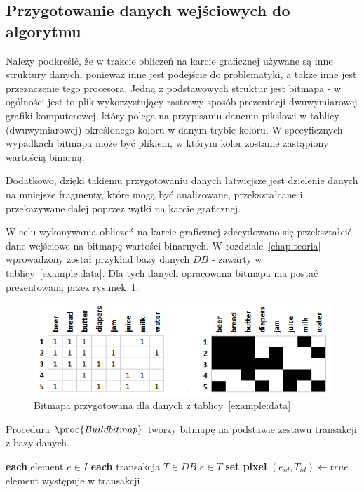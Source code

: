 \subsection{Przygotowanie danych wejściowych do algorytmu}

Należy podkreślć, że w trakcie obliczeń na karcie graficznej używane są inne struktury danych, ponieważ inne jest podejście do problematyki, a także inne jest przeznczenie tego procesora. Jedną z podstawowych struktur jest bitmapa - w ogólności jest to plik wykorzystujący rastrowy sposób prezentacji dwuwymiarowej grafiki komputerowej, który polega na przypisaniu danemu pikslowi w tablicy (dwuwymiarowej) określonego koloru w danym trybie koloru. W specyficznych wypadkach bitmapa może być plikiem, w którym kolor zostanie zastąpiony wartością binarną. 

Dodatkowo, dzięki takiemu przygotowaniu danych łatwiejsze jest dzielenie danych na mniejsze fragmenty, które mogą być analizowane, przekształcane i przekazywane dalej poprzez wątki na karcie graficznej.

W celu wykonywania obliczeń na karcie graficznej zdecydowano się przekształcić dane wejściowe na bitmapę wartości binarnych. W rozdziale~\ref{chap:teoria} wprowadzony został przykład bazy danych $DB$ - zawarty w tablicy~\ref{example:data}. Dla tych danych opracowana bitmapa ma postać prezentowaną przez rysunek~\ref{rys:example_bitmap}.

\begin{figure}[ht]
\centering
\includegraphics{figures/05/example_bitmap.png}
\caption{Bitmapa przygotowana dla danych z tablicy~\ref{example:data}}\label{rys:example_bitmap}
\end{figure}

Procedura $\proc{Build bitmap}$ tworzy bitmapę na podstawie zestawu transakcji z bazy danych.

\begin{codebox}
		\li \For \textbf{each} element $e \in I$ 
		\li \Do
			\li \For \textbf{each} transakcja $T \in DB$
					\li \Do 
						\If $e \in T$
						\li \Then
							\textbf{set pixel} $(e_{id}, T_{id}) \gets true$\label{li:set_bitmap}\CommentSymbol element występuje w transakcji
						\End
					\End
		\End
\end{codebox}

